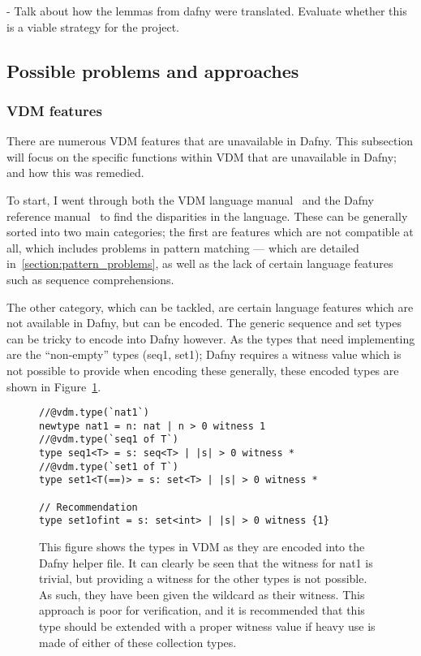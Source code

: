 \documentclass{entcs}
\begin{document}
- Talk about how the lemmas from dafny were translated. Evaluate whether this is a viable strategy for the project.

\subsection{Possible problems and approaches}

\subsubsection{VDM features}\label{section:vdm_features}\label{section:distributed_expressions}
There are numerous VDM features that are unavailable in Dafny. This subsection will focus on the specific functions within VDM that are unavailable in Dafny; and how this was remedied. 

To start, I went through both the VDM language manual~\cite{VDMLangMan} and the Dafny reference manual~\cite{DfyRef} to find the disparities in the language. These can be generally sorted into two main categories; the first are features which are not compatible at all, which includes problems in pattern matching --- which are detailed in~\ref{section:pattern_problems}, as well as the lack of certain language features such as sequence comprehensions. 

The other category, which can be tackled, are certain language features which are not available in Dafny, but can be encoded. The generic sequence and set types can be tricky to encode into Dafny however. As the types that need implementing are the ``non-empty'' types (seq1, set1); Dafny requires a witness value which is not possible to provide when encoding these generally, these encoded types are shown in Figure~\ref{fig:vdm_types_in_dafny}.

\begin{figure}[h]
	\begin{center}
        \begin{lstlisting}
//@vdm.type(`nat1`)
newtype nat1 = n: nat | n > 0 witness 1
//@vdm.type(`seq1 of T`)
type seq1<T> = s: seq<T> | |s| > 0 witness * 
//@vdm.type(`set1 of T`)
type set1<T(==)> = s: set<T> | |s| > 0 witness * 

// Recommendation
type set1ofint = s: set<int> | |s| > 0 witness {1}
        \end{lstlisting}
		\caption{This figure shows the types in VDM as they are encoded into the Dafny helper file. It can clearly be seen that the witness for nat1 is trivial, but providing a witness for the other types is not possible. As such, they have been given the wildcard as their witness. This approach is poor for verification, and it is recommended that this type should be extended with a proper witness value if heavy use is made of either of these collection types.}\label{fig:vdm_types_in_dafny}
	\end{center}
\end{figure}
\end{document}
